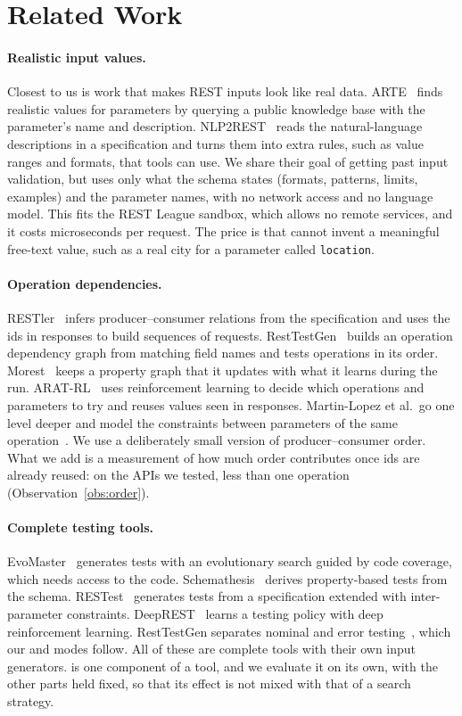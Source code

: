 \section{Related Work}
\label{sec:related}

\paragraph{Realistic input values.} Closest to us is work that makes REST
inputs look like real data. ARTE~\cite{arte} finds realistic values for
parameters by querying a public knowledge base with the parameter's name and
description. NLP2REST~\cite{nlp2rest} reads the natural-language descriptions
in a specification and turns them into extra rules, such as value ranges and
formats, that tools can use. We share their goal of getting past input
validation, but \tool uses only what the schema states (formats, patterns,
limits, examples) and the parameter names, with no network access and no
language model. This fits the REST League sandbox, which allows no remote
services, and it costs microseconds per request. The price is that \tool
cannot invent a meaningful free-text value, such as a real city for a
parameter called \texttt{location}.

\paragraph{Operation dependencies.} RESTler~\cite{restler} infers
producer--consumer relations from the specification and uses the ids in
responses to build sequences of requests. RestTestGen~\cite{resttestgen}
builds an operation dependency graph from matching field names and tests
operations in its order. Morest~\cite{morest} keeps a property graph that it
updates with what it learns during the run. ARAT-RL~\cite{arat-rl} uses
reinforcement learning to decide which operations and parameters to try and
reuses values seen in responses. Martin-Lopez et al.\ go one level deeper and
model the constraints between parameters of the same
operation~\cite{idl}. We use a deliberately small version of
producer--consumer order. What we add is a measurement of how much order
contributes once ids are already reused: on the APIs we tested, less than one
operation (Observation~\ref{obs:order}).

\paragraph{Complete testing tools.} EvoMaster~\cite{evomaster} generates
tests with an evolutionary search guided by code coverage, which needs access
to the code.
Schemathesis~\cite{schemathesis} derives property-based tests from the
schema. RESTest~\cite{restest} generates tests from a specification extended
with inter-parameter constraints. DeepREST~\cite{deeprest} learns a testing
policy with deep reinforcement learning. RestTestGen separates nominal and
error testing~\cite{resttestgen-stvr}, which our  and
 modes follow. All of these are complete tools with their own
input generators. \tool is one component of a tool, and we evaluate it on
its own, with the other parts held fixed, so that its effect is not mixed
with that of a search strategy.

